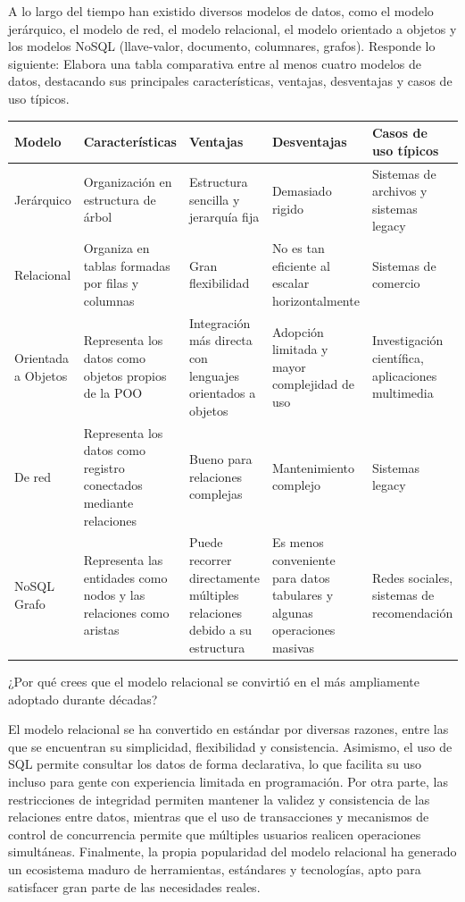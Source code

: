 \item A lo largo del tiempo han existido diversos modelos de datos, como el modelo jerárquico, el modelo de red, el modelo relacional, el modelo orientado a objetos y los modelos NoSQL (llave-valor, documento, columnares, grafos). Responde lo siguiente: Elabora una tabla comparativa entre al menos cuatro modelos de datos, destacando sus principales características, ventajas, desventajas y casos de uso típicos.\cite{mongodb2026types}

\begin{center}
\begin{tabular}{|p{2cm}|p{3.5cm}|p{3.5cm}|p{3.5cm}|p{3.5cm}|}
 \hline
 Modelo & Características & Ventajas & Desventajas & Casos de uso típicos \\ \hline
 Jerárquico & Organización en estructura de árbol & Estructura sencilla y jerarquía fija & Demasiado rigido & Sistemas de archivos y sistemas legacy \\ \hline
 Relacional & Organiza en tablas formadas por filas y columnas & Gran flexibilidad & No es tan eficiente al escalar horizontalmente & Sistemas de comercio \\ \hline
 Orientada a Objetos & Representa los datos como objetos propios de la POO & Integración más directa con lenguajes orientados a objetos & Adopción limitada y mayor complejidad de uso & Investigación científica, aplicaciones multimedia \\ \hline
 De red & Representa los datos como registro conectados mediante relaciones & Bueno para relaciones complejas & Mantenimiento complejo & Sistemas legacy \\ \hline
 NoSQL Grafo & Representa las entidades como nodos y las relaciones como aristas & Puede recorrer directamente múltiples relaciones debido a su estructura & Es menos conveniente para datos tabulares y algunas operaciones masivas & Redes sociales, sistemas de recomendación \\
 \hline
\end{tabular}
\end{center}

¿Por qué crees que el modelo relacional se convirtió en el más ampliamente adoptado durante décadas?

El modelo relacional se ha convertido en estándar por diversas razones, entre las que se encuentran su simplicidad, flexibilidad y consistencia. Asimismo, el uso de SQL permite consultar los datos de forma declarativa, lo que facilita su uso incluso para gente con experiencia limitada en programación. \cite{ibm_structured_query_language} Por otra parte, las restricciones de integridad permiten mantener la validez y consistencia de las relaciones entre datos, mientras que el uso de transacciones y mecanismos de control de concurrencia permite que múltiples usuarios realicen operaciones simultáneas. Finalmente, la propia popularidad del modelo relacional ha generado un ecosistema maduro de herramientas, estándares y tecnologías, apto para satisfacer gran parte de las necesidades reales.\cite{ibm_referential_integrity}

